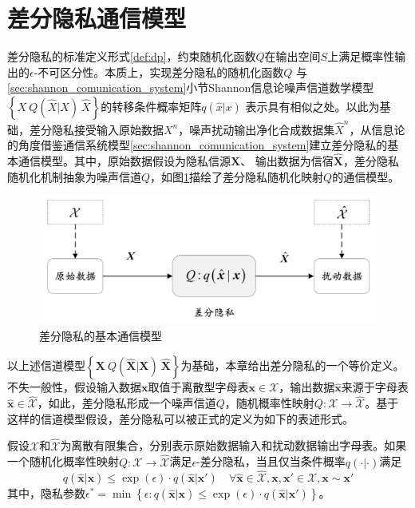\section{差分隐私通信模型}\label{sec:communication_model_of_dp}
差分隐私的标准定义形式\ref{def:dp}，约束随机化函数$Q$在输出空间$S$上满足概率性输出的$\epsilon$-不可区分性。本质上，实现差分隐私的随机化函数$Q$ 与\ref{sec:shannon_comunication_system}小节Shannon信息论噪声信道数学模型$\left \{X~Q(\hat{X}|X)~\hat{X}\right \}$的转移条件概率矩阵$q(\hat{x}|x)$ 表示具有相似之处。以此为基础，差分隐私接受输入原始数据$X^n$，噪声扰动输出净化合成数据集$\hat{X}^n$，从信息论的角度借鉴通信系统模型\ref{sec:shannon_comunication_system}建立差分隐私的基本通信模型。其中，原始数据假设为隐私信源$\bm{X}$、 输出数据为信宿$\hat{\bm{X}}$，差分隐私随机化机制抽象为噪声信道$Q$，如图\ref{fig:chapter04-communication_of_dp}描绘了差分隐私随机化映射$Q$的通信模型。

 \begin{figure}[htbp]
 	\centering
 	\includegraphics[width = 0.65\linewidth]{./figures/chapter04_1.jpg}
 	\caption{差分隐私的基本通信模型}
 	\label{fig:chapter04-communication_of_dp}
 \end{figure}


  以上述信道模型$\left \{\bm{X}~Q(\hat{\bm{X}}|\bm{X})~\hat{\bm{X}}\right \}$为基础，本章给出差分隐私的一个等价定义。不失一般性，假设输入数据$\bm{x}$取值于离散型字母表$\bm{x}\in \mathcal{X}$，输出数据$\hat{\bm{x}}$来源于字母表$\hat{\bm{x}} \in \hat{\mathcal{X}}$，如此，差分隐私形成一个噪声信道$Q$，随机概率性映射$Q:\mathcal{X}\rightarrow \hat{\mathcal{X}}$。基于这样的信道模型假设，差分隐私可以被正式的定义为如下的表述形式\cite{alvim2011differential}。

 \begin{definition}\label{def:dp_channel}假设$\mathcal{X}$和$\hat{\mathcal{X}}$为离散有限集合，分别表示原始数据输入和扰动数据输出字母表。如果一个随机化概率性映射$Q:\mathcal{X}\rightarrow \hat{\mathcal{X}}$满足$\epsilon$-差分隐私，当且仅当条件概率$q(\cdot|\cdot)$满足
 	\begin{equation}
 		q(\hat{\bm{x}}|\bm{x})\leq \exp(\epsilon) \cdot q(\hat{\bm{x}}|\bm{x}') \quad  \forall \hat{\bm{x}} \in \hat{\mathcal{X}}, \bm{x},\bm{x}' \in \mathcal{X}, \bm{x}\sim \bm{x}'
 	\end{equation}
 其中，隐私参数$\epsilon^* = \min\left\{\epsilon:q(\hat{\bm{x}}|\bm{x})\leq \exp(\epsilon) \cdot q(\hat{\bm{x}}|\bm{x}')\right\}$。
 \end{definition}

